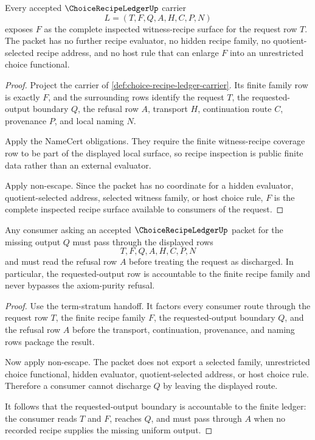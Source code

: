 \begin{theorem}
\label{thm:choice-recipe-ledger-finite-recipe-coverage}
Every accepted $\ChoiceRecipeLedgerUp$ carrier
$$
L=(T,F,Q,A,H,C,P,N)
$$
exposes $F$ as the complete inspected witness-recipe surface for the request row $T$. The packet has no further recipe evaluator, no hidden recipe family, no quotient-selected recipe address, and no host rule that can enlarge $F$ into an unrestricted choice functional.
\end{theorem}
\begin{proof}
Project the carrier of \autoref{def:choice-recipe-ledger-carrier}. Its finite family row is exactly $F$, and the surrounding rows identify the request $T$, the requested-output boundary $Q$, the refusal row $A$, transport $H$, continuation route $C$, provenance $P$, and local naming $N$.

Apply the NameCert obligations. They require the finite witness-recipe coverage row to be part of the displayed local surface, so recipe inspection is public finite data rather than an external evaluator.

Apply non-escape. Since the packet has no coordinate for a hidden evaluator, quotient-selected address, selected witness family, or host choice rule, $F$ is the complete inspected recipe surface available to consumers of the request.
\end{proof}

\begin{theorem}
\label{thm:choice-recipe-ledger-request-output-accountability}
Any consumer asking an accepted $\ChoiceRecipeLedgerUp$ packet for the missing output $Q$ must pass through the displayed rows
$$
T,F,Q,A,H,C,P,N
$$
and must read the refusal row $A$ before treating the request as discharged. In particular, the requested-output row is accountable to the finite recipe family and never bypasses the axiom-purity refusal.
\end{theorem}
\begin{proof}
Use the term-stratum handoff. It factors every consumer route through the request row $T$, the finite recipe family $F$, the requested-output boundary $Q$, and the refusal row $A$ before the transport, continuation, provenance, and naming rows package the result.

Now apply non-escape. The packet does not export a selected family, unrestricted choice functional, hidden evaluator, quotient-selected address, or host choice rule. Therefore a consumer cannot discharge $Q$ by leaving the displayed route.

It follows that the requested-output boundary is accountable to the finite ledger: the consumer reads $T$ and $F$, reaches $Q$, and must pass through $A$ when no recorded recipe supplies the missing uniform output.
\end{proof}


